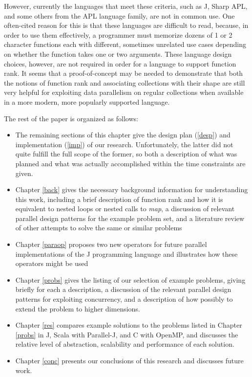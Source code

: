 However, currently the languages that meet these criteria, 
such as J, Sharp APL, and some others from the APL language family, 
are not in common use. %
One often-cited reason for this is that these languages are difficult to read, %
because, in order to use them effectively, a programmer must memorize 
dozens of 1 or 2 character functions each with different, sometimes unrelated use cases 
depending on whether the function takes one or two arguments\cite{jvocab}\cite{dapl}. 
These language design choices, however, 
are not required in order for a language to support function rank.
It seems that a proof-of-concept may be needed 
to demonstrate that both the notions of function rank
and associating collections with their shape
are still very helpful for exploiting data parallelism on regular collections 
when available in a more modern, more popularly supported language.

The rest of the paper is organized as follows:
\begin{itemize} 
	\item The remaining sections of this chapter give the design plan (\ref{desp}) and implementation (\ref{imp}) of our research. 
	Unfortunately, the latter did not quite fulfill the full scope of the former, 
	so both a description of what was planned and what was actually accomplished within the time constraints are given.
	\item Chapter \ref{back} gives the necessary background information for understanding this work, 
	including a brief description of function rank and how it is equivalent to nested loops or nested calls to \textit{map},
	a discussion of relevant parallel design patterns for the example problem set, 
	and a literature review of other attempts to solve the same or similar problems
	\item Chapter \ref{paraop} proposes two new operators for future parallel implementations of the J programming language 
		and illustrates how these operators might be used
    \item Chapter \ref{probs} gives the listing of our selection of example problems, giving briefly for each a description, a discussion of the relevant parallel design patterns for exploiting concurrency, and a description of how possibly to extend the problem to higher dimensions.
    \item Chapter \ref{res} compares example solutions to the problems listed in Chapter \ref{probs} 
		in J, Scala with Parallel-J, and C with OpenMP, 
		and discusses the relative level of abstraction, scalability and performance of each solution. %
    \item Chapter \ref{conc} presents our conclusions of this research and discusses future work. 
\end{itemize}

